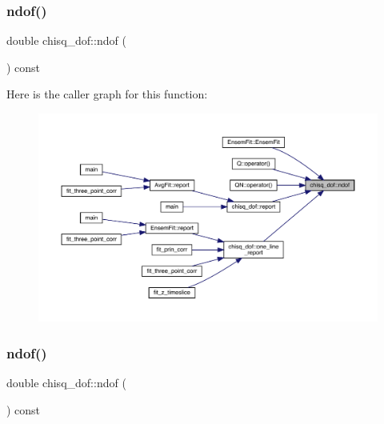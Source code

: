 \subsubsection{\texorpdfstring{ndof()}{ndof()}\hspace{0.1cm}{\footnotesize\ttfamily [1/2]}}
{\footnotesize\ttfamily double chisq\+\_\+dof\+::ndof (\begin{DoxyParamCaption}{ }\end{DoxyParamCaption}) const\hspace{0.3cm}{\ttfamily [inline]}}

Here is the caller graph for this function\+:
\nopagebreak
\begin{figure}[H]
\begin{center}
\leavevmode
\includegraphics[width=350pt]{d0/dcc/structchisq__dof_a14e009144be8062101c59798a6239f5b_icgraph}
\end{center}
\end{figure}
\mbox{\label{structchisq__dof_a14e009144be8062101c59798a6239f5b}} 
\subsubsection{\texorpdfstring{ndof()}{ndof()}\hspace{0.1cm}{\footnotesize\ttfamily [2/2]}}
{\footnotesize\ttfamily double chisq\+\_\+dof\+::ndof (\begin{DoxyParamCaption}{ }\end{DoxyParamCaption}) const\hspace{0.3cm}{\ttfamily [inline]}}

\mbox{\label{structchisq__dof_af82b1ce8f285c664b9c9529df2dc527a}} 
